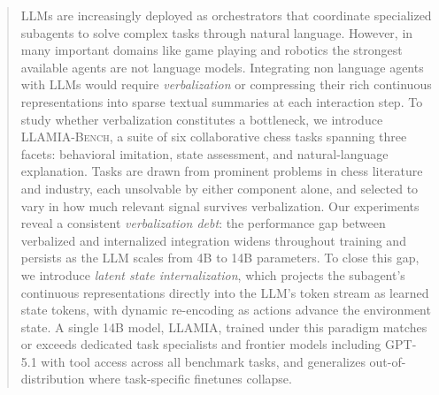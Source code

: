 \documentclass[11pt]{article}
\theoremstyle{plain}
\theoremstyle{definition}
\theoremstyle{remark}
\begin{document}
\begin{abstract}
  LLMs are increasingly deployed as orchestrators that coordinate specialized subagents
  to solve complex tasks through natural language. However, in many important domains like game playing and robotics
  the strongest available agents are not language models. Integrating non language agents with LLMs would require \emph{verbalization} or compressing their rich continuous representations into sparse textual summaries at each interaction step.
  To study whether verbalization constitutes a bottleneck, we introduce \textsc{LLAMIA-Bench}, a suite of six collaborative chess tasks spanning three facets: behavioral imitation, state assessment, and natural-language explanation. Tasks are drawn from prominent problems in chess literature and industry, each unsolvable by either component alone, and selected to vary in how much relevant signal survives verbalization.
  Our experiments reveal a consistent \emph{verbalization debt}: the performance gap between verbalized and internalized integration widens throughout training and persists as the LLM scales from 4B to 14B parameters. To close this gap, we introduce \emph{latent state internalization}, which projects the subagent's continuous representations directly into the LLM's token stream as learned state tokens, with dynamic re-encoding as actions advance the environment state. A single 14B model,
  \textsc{LLAMIA}, trained under this paradigm matches or exceeds dedicated task specialists and frontier models including GPT-5.1 with tool access across all benchmark tasks, and generalizes out-of-distribution where task-specific finetunes collapse.
  \end{abstract}







%



\clearpage

\appendix


\end{document}

